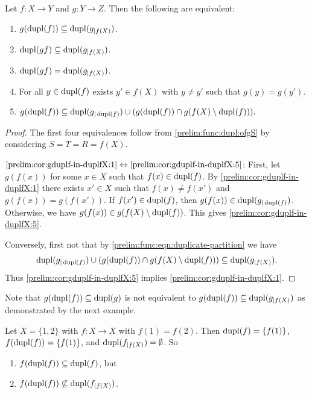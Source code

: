 \begin{corollary} \label{prelim:cor:gduplf-in-duplfX}
	Let $f \colon X \to Y$ and $g \colon Y \to Z$. Then the following are equivalent:
	\begin{enumerate}
		\item \label{prelim:cor:gduplf-in-duplfX:1} $g(\dupl{f}) \subseteq \dupl{g_{|f(X)}}$.
		
		\item $\dupl{\concat{f}{g}} \subseteq \dupl{g_{|f(X)}}$.
		
		\item $\dupl{\concat{f}{g}} = \dupl{g_{|f(X)}}$.
		
		\item \label{prelim:cor:gduplf-in-duplfX:5} For all $y \in \dupl{f}$ exists $y' \in f(X)$ with $y \ne y'$
		such that $g(y) = g(y')$.
		
		\item \label{prelim:cor:gduplf-in-duplfX:5}
		$
		g(\dupl{f}) \subseteq \dupl{g_{|\dupl{f}}} \cup (g(\dupl{f}) \cap g(f(X) \setminus \dupl{f})).
		$		
	\end{enumerate}	
\end{corollary}
\begin{proof}
	The first four equivalences follow from \cref{prelim:func:dupl:ofgS} 
	by considering $S = T = R = f(X)$.	
		
	$\ref{prelim:cor:gduplf-in-duplfX:1}\Leftrightarrow \ref{prelim:cor:gduplf-in-duplfX:5}$:
	First, let $g(f(x))$ for some $x \in X$ such that $f(x) \in \dupl{f}$.
	By \cref{prelim:cor:gduplf-in-duplfX:1} 
	there exists $x' \in X$ such that $f(x) \ne f(x')$
	and $g(f(x)) = g(f(x'))$.
	If $f(x') \in \dupl{f}$, then $g(f(x)) \in \dupl{g_{|\dupl{f}}}$.
	Otherwise, we have $g(f(x)) \in g(f(X) \setminus \dupl{f})$.
	This gives \cref{prelim:cor:gduplf-in-duplfX:5}.
	
	Conversely, first not that by \cref{prelim:func:eqn:duplicate-partition} we have
	\[
	\dupl{g_{|\dupl{f}}} \cup (g(\dupl{f}) \cap g(f(X) \setminus \dupl{f}))
	\subseteq \dupl{g_{|f(X)}}.
	\]
	Thus \cref{prelim:cor:gduplf-in-duplfX:5} implies \cref{prelim:cor:gduplf-in-duplfX:1}.
\end{proof}

Note that $g(\dupl{f}) \subseteq \dupl{g}$
is not equivalent to  $g(\dupl{f}) \subseteq \dupl{g_{|f(X)}}$
as demonstrated by the next example.

\begin{example}
	Let $X = \{1,2\}$ with $f \colon X \to X$
	with $f(1) = f(2)$.
	Then $\dupl{f} = \{f(1)\}$, $f(\dupl{f}) = \{f(1)\}$,
	and $\dupl{f_{|f(X)}} = \emptyset$.
	So
	\begin{enumerate}
	\item $f(\dupl{f}) \subseteq \dupl{f}$, but
	
	\item $f(\dupl{f}) \not\subseteq \dupl{f_{|f(X)}}$.
\end{enumerate}
\end{example}



